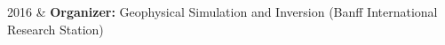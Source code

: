 \documentclass[a4paper, 11pt]{article}
\newcommand{\heading}[1]{
    \begin{minipage}[t]{\textwidth}
    \vspace{0.05cm}
    {\Large #1}\\
    \vspace{-0.35cm}
    \hrule
    \end{minipage}
    \vspace{0.1cm}
}
\newcommand{\subheading}[1]{
    \vspace{-0.1cm}
    {\large #1}\\
    \vspace{-0.3cm}
}
\newcommand{\tworow}[1]{\multirow{2}{2.2cm}{#1}}
\begin{document}
\begin{entryright}
    2016 & \textbf{Organizer:} Geophysical Simulation and Inversion (Banff International Research Station) \\
\end{entryright}







\end{document}
